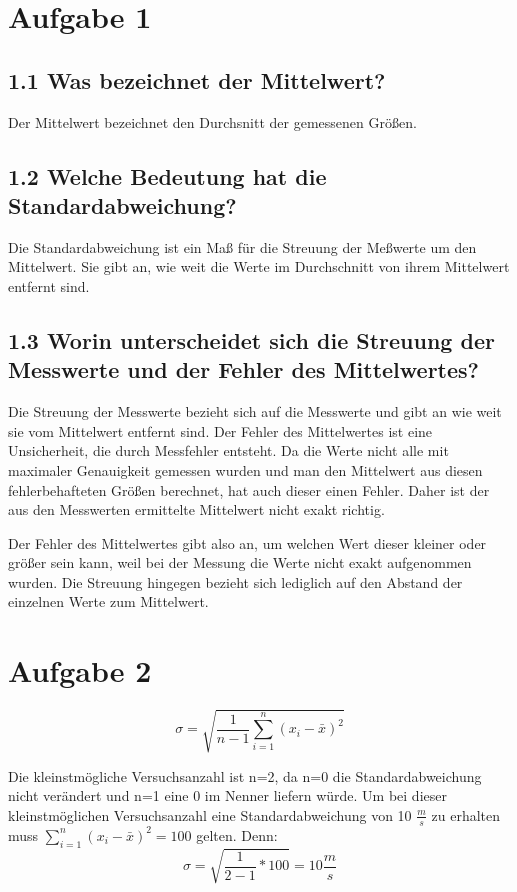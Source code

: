 \documentclass{scrartcl}
\begin{document}
   
\section{Aufgabe 1}
\subsection{1.1 Was bezeichnet der Mittelwert?}

Der Mittelwert bezeichnet den Durchsnitt der gemessenen Größen.

\subsection{1.2 Welche Bedeutung hat die Standardabweichung?}

Die Standardabweichung ist ein Maß für die Streuung der Meßwerte um den Mittelwert.
Sie gibt an, wie weit die Werte im Durchschnitt von ihrem Mittelwert entfernt sind.

\subsection{1.3 Worin unterscheidet sich die Streuung der Messwerte und der Fehler des Mittelwertes?}

Die Streuung der Messwerte bezieht sich auf die Messwerte und gibt an wie weit sie vom Mittelwert entfernt sind.
Der Fehler des Mittelwertes ist eine Unsicherheit, die durch Messfehler entsteht.
Da die Werte nicht alle mit maximaler Genauigkeit gemessen wurden und man den Mittelwert aus diesen fehlerbehafteten Größen berechnet,
hat auch dieser einen Fehler.
Daher ist der aus den Messwerten ermittelte Mittelwert nicht exakt richtig. 

Der Fehler des Mittelwertes gibt also an, um welchen Wert dieser kleiner oder größer sein kann, weil bei der Messung die Werte nicht exakt aufgenommen wurden.
Die Streuung hingegen bezieht sich lediglich auf den Abstand der einzelnen Werte zum Mittelwert.

\section{Aufgabe 2}

\begin{displaymath}
    \sigma = \sqrt{\frac{1}{n-1} \sum_{i=1}^{n} (x_i - \bar{x})^2}
\end{displaymath}

Die kleinstmögliche Versuchsanzahl ist n=2, da n=0 die Standardabweichung nicht verändert und n=1 eine 0 im Nenner liefern würde.
Um bei dieser kleinstmöglichen Versuchsanzahl eine Standardabweichung von 10 $\frac{m}{s}$ zu erhalten muss $\sum_{i=1}^{n} (x_i - \bar{x})^2 = 100$ gelten.
Denn:
\begin{displaymath}
    \sigma = \sqrt{\frac{1}{2-1} * 100 } = 10 \frac{m}{s}
\end{displaymath}
\end{document}
